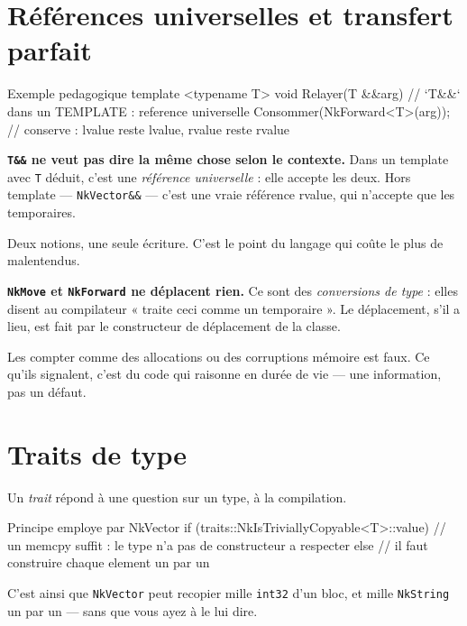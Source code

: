 \section{Références universelles et transfert parfait}

\begin{nkcode}{Exemple pedagogique}
template <typename T>
void Relayer(T &&arg) {           // `T&&` dans un TEMPLATE : reference universelle
    Consommer(NkForward<T>(arg)); // conserve : lvalue reste lvalue, rvalue reste rvalue
}
\end{nkcode}

\begin{nkpiege}
\textbf{\texttt{T\&\&} ne veut pas dire la même chose selon le contexte.} Dans un
template avec \texttt{T} déduit, c'est une \emph{référence universelle} : elle
accepte les deux. Hors template --- \texttt{NkVector\&\&} --- c'est une vraie
référence rvalue, qui n'accepte que les temporaires.

Deux notions, une seule écriture. C'est le point du langage qui coûte le plus de
malentendus.
\end{nkpiege}

\begin{nkpiege}
\textbf{\texttt{NkMove} et \texttt{NkForward} ne déplacent rien.} Ce sont des
\emph{conversions de type} : elles disent au compilateur « traite ceci comme un
temporaire ». Le déplacement, s'il a lieu, est fait par le constructeur de
déplacement de la classe.

Les compter comme des allocations ou des corruptions mémoire est faux. Ce qu'ils
signalent, c'est du code qui raisonne en durée de vie --- une information, pas un
défaut.
\end{nkpiege}

\section{Traits de type}

Un \emph{trait} répond à une question sur un type, à la compilation.

\begin{nkcode}{Principe employe par NkVector}
if (traits::NkIsTriviallyCopyable<T>::value) {
    // un memcpy suffit : le type n'a pas de constructeur a respecter
} else {
    // il faut construire chaque element un par un
}
\end{nkcode}

C'est ainsi que \texttt{NkVector} peut recopier mille \texttt{int32} d'un bloc,
et mille \texttt{NkString} un par un --- sans que vous ayez à le lui dire.

